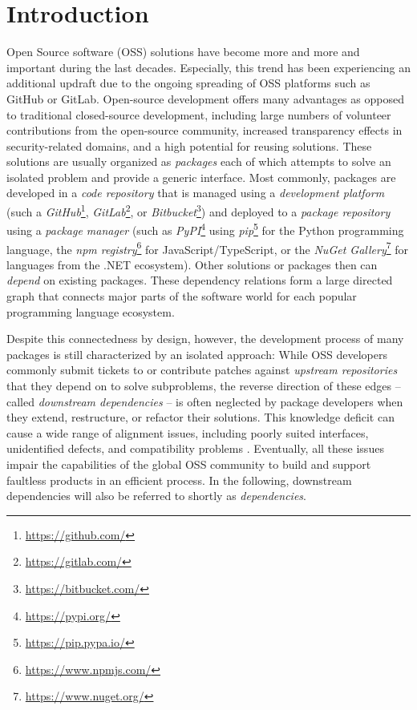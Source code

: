 \section{Introduction}
\label{sec:introduction}

Open Source software (OSS) solutions have become more and more and important during the last decades.
Especially, this trend has been experiencing an additional updraft due to the ongoing spreading of OSS platforms such as GitHub or GitLab.
Open-source development offers many advantages as opposed to traditional closed-source development, including large numbers of volunteer contributions from the open-source community, increased transparency effects in security-related domains, and a high potential for reusing solutions.
These solutions are usually organized as \emph{packages} each of which attempts to solve an isolated problem and provide a generic interface.
Most commonly, packages are developed in a \emph{code repository} that is managed using a \emph{development platform} (such a \emph{GitHub}\footnote{\url{https://github.com/}}, \emph{GitLab}\footnote{\url{https://gitlab.com/}}, or \emph{Bitbucket}\footnote{\url{https://bitbucket.com/}}) and deployed to a \emph{package repository} using a \emph{package manager} (such as \emph{PyPI}\footnote{\url{https://pypi.org/}} using \emph{pip}\footnote{\url{https://pip.pypa.io/}} for the Python programming language, the \emph{npm registry}\footnote{\url{https://www.npmjs.com/}} for JavaScript/TypeScript, or the \emph{NuGet Gallery}\footnote{\url{https://www.nuget.org/}} for languages from the .NET ecosystem).
Other solutions or packages then can \emph{depend} on existing packages.
These dependency relations form a large directed graph that connects major parts of the software world for each popular programming language ecosystem.

Despite this connectedness by design, however, the development process of many packages is still characterized by an isolated approach:
While OSS developers commonly submit tickets to or contribute patches against \emph{upstream repositories} that they depend on to solve subproblems, the reverse direction of these edges -- called \emph{downstream dependencies} -- is often neglected by package developers when they extend, restructure, or refactor their solutions.
This knowledge deficit can cause a wide range of alignment issues, including poorly suited interfaces, unidentified defects, and compatibility problems \citep[see][]{bogart2015breaks}.
Eventually, all these issues impair the capabilities of the global OSS community to build and support faultless products in an efficient process.
In the following, downstream dependencies will also be referred to shortly as \emph{dependencies}.

